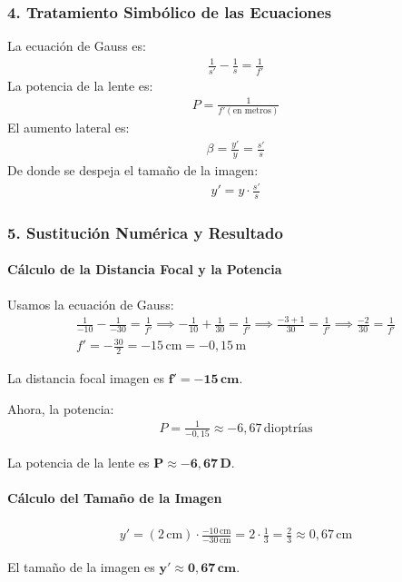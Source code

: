 \subsubsection*{4. Tratamiento Simbólico de las Ecuaciones}
La ecuación de Gauss es:
\begin{gather}
    \frac{1}{s'} - \frac{1}{s} = \frac{1}{f'}
\end{gather}
La potencia de la lente es:
\begin{gather}
    P = \frac{1}{f' (\text{en metros})}
\end{gather}
El aumento lateral es:
\begin{gather}
    \beta = \frac{y'}{y} = \frac{s'}{s}
\end{gather}
De donde se despeja el tamaño de la imagen:
\begin{gather}
    y' = y \cdot \frac{s'}{s}
\end{gather}

\subsubsection*{5. Sustitución Numérica y Resultado}
\paragraph*{Cálculo de la Distancia Focal y la Potencia}
Usamos la ecuación de Gauss:
\begin{gather}
    \frac{1}{-10} - \frac{1}{-30} = \frac{1}{f'} \implies -\frac{1}{10} + \frac{1}{30} = \frac{1}{f'} \implies \frac{-3+1}{30} = \frac{1}{f'} \implies \frac{-2}{30} = \frac{1}{f'} \nonumber \\[8pt]
    f' = -\frac{30}{2} = -15 \, \text{cm} = -0,15 \, \text{m}
\end{gather}
\begin{cajaresultado}
La distancia focal imagen es $\boldsymbol{f' = -15 \, cm}$.
\end{cajaresultado}
Ahora, la potencia:
\begin{gather}
    P = \frac{1}{-0,15} \approx -6,67 \, \text{dioptrías}
\end{gather}
\begin{cajaresultado}
La potencia de la lente es $\boldsymbol{P \approx -6,67 \, D}$.
\end{cajaresultado}
\paragraph*{Cálculo del Tamaño de la Imagen}
\begin{gather}
    y' = (2 \, \text{cm}) \cdot \frac{-10 \, \text{cm}}{-30 \, \text{cm}} = 2 \cdot \frac{1}{3} = \frac{2}{3} \approx 0,67 \, \text{cm}
\end{gather}
\begin{cajaresultado}
El tamaño de la imagen es $\boldsymbol{y' \approx 0,67 \, cm}$.
\end{cajaresultado}

